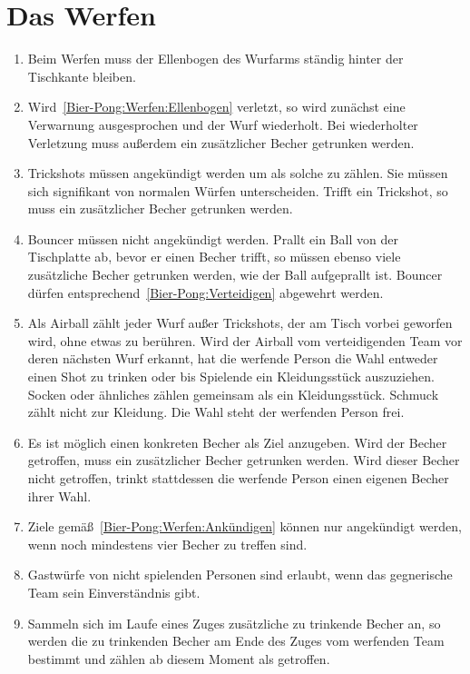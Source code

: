 \section{Das Werfen}
\begin{enumerate}[label={(\arabic*)}]
    \item\label{Bier-Pong:Werfen:Ellenbogen}
    Beim Werfen muss der Ellenbogen des Wurfarms ständig hinter der Tischkante bleiben.

    \item
    Wird~\ref{Bier-Pong:Werfen:Ellenbogen} verletzt, so wird zunächst eine Verwarnung ausgesprochen und der Wurf wiederholt.
    Bei wiederholter Verletzung muss außerdem ein zusätzlicher Becher getrunken werden.

    \item
    \glqq{} Trickshots\grqq{} müssen angekündigt werden um als solche zu zählen.
    Sie müssen sich signifikant von normalen Würfen unterscheiden.
    Trifft ein Trickshot, so muss ein zusätzlicher Becher getrunken werden.

    \item
    \glqq{} Bouncer\grqq{} müssen nicht angekündigt werden.
    Prallt ein Ball von der Tischplatte ab, bevor er einen Becher trifft, so müssen ebenso viele zusätzliche Becher getrunken werden, wie der Ball aufgeprallt ist.
    Bouncer dürfen entsprechend~\ref{Bier-Pong:Verteidigen} abgewehrt werden.

    \item
    Als \glqq{} Airball\grqq{} zählt jeder Wurf außer Trickshots, der am Tisch vorbei geworfen wird, ohne etwas zu berühren.
    Wird der Airball vom verteidigenden Team vor deren nächsten Wurf erkannt, hat die werfende Person die Wahl entweder einen Shot zu trinken oder bis Spielende ein Kleidungsstück auszuziehen.
    Socken oder ähnliches zählen gemeinsam als ein Kleidungsstück.
    Schmuck zählt nicht zur Kleidung.
    Die Wahl steht der werfenden Person frei.

    \item\label{Bier-Pong:Werfen:Ankündigen}
    Es ist möglich einen konkreten Becher als Ziel anzugeben.
    Wird der Becher getroffen, muss ein zusätzlicher Becher getrunken werden.
    Wird dieser Becher nicht getroffen, trinkt stattdessen die werfende Person einen eigenen Becher ihrer Wahl.

    \item
    Ziele gemäß~\ref{Bier-Pong:Werfen:Ankündigen} können nur angekündigt werden, wenn noch mindestens vier Becher zu treffen sind.

    \item
    Gastwürfe von nicht spielenden Personen sind erlaubt, wenn das gegnerische Team sein Einverständnis gibt.

    \item
    Sammeln sich im Laufe eines Zuges zusätzliche zu trinkende Becher an, so werden die zu trinkenden Becher am Ende des Zuges vom werfenden Team bestimmt und zählen ab diesem Moment als getroffen.
\end{enumerate}

